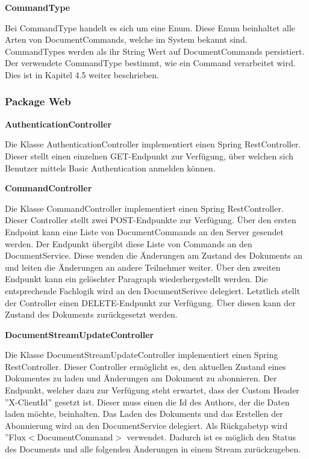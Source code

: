 \textbf{CommandType}

Bei CommandType handelt es sich um eine Enum.
Diese Enum beinhaltet alle Arten von DocumentCommands, welche im System bekannt sind.
CommandTypes werden als ihr String Wert auf DocumentCommands persistiert.
Der verwendete CommandType bestimmt, wie ein Command verarbeitet wird.
Dies ist in Kapitel 4.5 weiter beschrieben.

\subsubsection{Package Web}

\textbf{AuthenticationController}

Die Klasse AuthenticationController implementiert einen Spring RestController.
Dieser stellt einen einzelnen GET-Endpunkt zur Verfügung, über welchen sich Benutzer mittels Basic Authentication anmelden können.

\textbf{CommandController}

Die Klasse CommandController implementiert einen Spring RestController.
Dieser Controller stellt zwei POST-Endpunkte zur Verfügung.
Über den ersten Endpoint kann eine Liste von DocumentCommands an den Server gesendet werden.
Der Endpunkt übergibt diese Liste von Commands an den DocumentService.
Diese wenden die Änderungen am Zustand des Dokuments an und leiten die Änderungen an andere Teilnehmer weiter.
Über den zweiten Endpunkt kann ein gelöschter Paragraph wiederhergestellt werden.
Die entsprechende Fachlogik wird an den DocumentSerivce delegiert.
Letztlich stellt der Controller einen DELETE-Endpunkt zur Verfügung.
Über diesen kann der Zustand des Dokuments zurückgesetzt werden.

\textbf{DocumentStreamUpdateController}

Die Klasse DocumentStreamUpdateController implementiert einen Spring RestController.
Dieser Controller ermöglicht es, den aktuellen Zustand eines Dokumentes zu laden und Änderungen am Dokument zu abonnieren.
Der Endpunkt, welcher dazu zur Verfügung steht erwartet, dass der Custom Header ''X-ClientId'' gesetzt ist.
Dieser muss einen die Id des Authors, der die Daten laden möchte, beinhalten.
Das Laden des Dokuments und das Erstellen der Abonnierung wird an den DocumentService delegiert.
Als Rückgabetyp wird ''Flux$<$DocumentCommand$>$ verwendet.
Dadurch ist es möglich den Status des Documents und alle folgenden Änderungen in einem Stream zurückzugeben.

\clearpage

